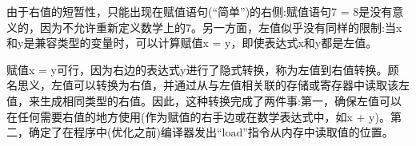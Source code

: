 由于右值的短暂性，只能出现在赋值语句(“简单”)的右侧:赋值语句7 = 8是没有意义的，因为不允许重新定义数学上的7。另一方面，左值似乎没有同样的限制:当x和y是兼容类型的变量时，可以计算赋值x = y，即使表达式x和y都是左值。

赋值x = y可行，因为右边的表达式y进行了隐式转换，称为左值到右值转换。顾名思义，左值可以转换为右值，并通过从与左值相关联的存储或寄存器中读取该左值，来生成相同类型的右值。因此，这种转换完成了两件事:第一，确保左值可以在任何需要右值的地方使用(作为赋值的右手边或在数学表达式中，如x + y)。第二，确定了在程序中(优化之前)编译器发出“load”指令从内存中读取值的位置。


















